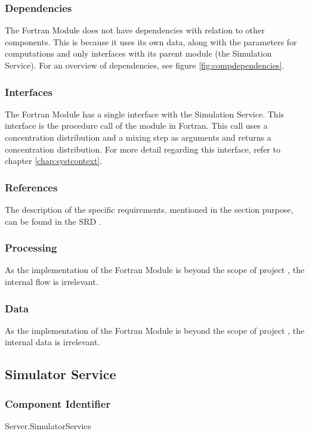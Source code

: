 \subsubsection*{Dependencies}
The Fortran Module does not have dependencies with relation to other components. This is because it uses its own data, along with the parameters for computations and only interfaces with its parent module (the Simulation Service). For an overview of dependencies, see figure \ref{fig:compdependencies}.

\subsubsection*{Interfaces}
The Fortran Module has a single interface with the Simulation Service. This interface is the procedure call of the module in Fortran. This call uses a concentration distribution and a mixing step as arguments and returns a concentration distribution. For more detail regarding this interface, refer to chapter \ref{chap:systcontext}.

\subsubsection*{References}
The description of the specific requirements, mentioned in the section purpose, can be found in the SRD \cite{srd}.

\subsubsection*{Processing}
As the implementation of the Fortran Module is beyond the scope of project \projectname, the internal flow is irrelevant.

\subsubsection*{Data}
As the implementation of the Fortran Module is beyond the scope of project \projectname, the internal data is irrelevant.

\subsection{Simulator Service}
\label{subsec:simulatorservice}

\subsubsection*{Component Identifier}
Server.SimulatorService

